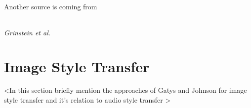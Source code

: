 Another source is coming from \cite{Liu2019}

\\ \textit{Grinstein et al.} \cite{}

\section{Image Style Transfer}
\label{sec:imgstyletransfer}

<In this section briefly mention the approaches of Gatys and Johnson for image style transfer and it's relation to audio style transfer \cite{Gatys2016, johnson2016perceptual}>